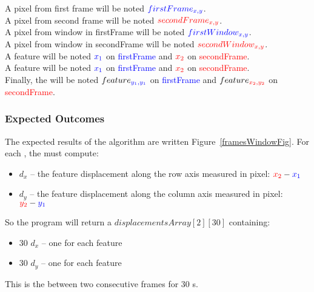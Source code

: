 A pixel from first frame will be noted $\textcolor{blue}{firstFrame_{x,y}}$.\\
A pixel from second frame will be noted $\textcolor{red}{secondFrame_{x,y}}$.\\
A pixel from window in firstFrame will be noted $\textcolor{blue}{firstWindow_{x,y}}$.\\
A pixel from window in secondFrame will be noted $\textcolor{red}{secondWindow_{x,y}}$.\\
A feature  will be noted $\textcolor{blue}{x_{1}}$ on \textcolor{blue}{firstFrame} and $\textcolor{red}{x_{2}}$ on \textcolor{red}{secondFrame}.\\
A feature  will be noted $\textcolor{blue}{x_{1}}$ on \textcolor{blue}{firstFrame} and $\textcolor{red}{x_{2}}$ on \textcolor{red}{secondFrame}.\\
Finally, the  will be noted $feature_{\textcolor{blue}{y_{1},y_{1}}}$ on \textcolor{blue}{firstFrame} and $feature_{\textcolor{red}{x_{2},y_{2}}}$ on \textcolor{red}{secondFrame}.

\subsubsection{Expected Outcomes}

The expected results of the \flow{} algorithm are written Figure~\ref{framesWindowFig}. For each \feat{}, the \vc{} must compute:
\begin{itemize}
	\item \textbf{$d_{x}$} -- the feature displacement along the row axis measured in pixel: $\textcolor{red}{x_{2}}-\textcolor{blue}{x_{1}}$
	\item \textbf{$d_{y}$} -- the feature displacement along the column axis measured in pixel: $\textcolor{red}{y_{2}}-\textcolor{blue}{y_{1}}$
\end{itemize}

So the \flow{} program will return a  $displacementsArray[2][30]$ containing:
\begin{itemize}
	\item 30 $d_{x}$  -- one for each feature
	\item 30 $d_{y}$  -- one for each feature
\end{itemize}

This is the \flow{} between two consecutive frames for 30 \feat{}s.
\newpage

